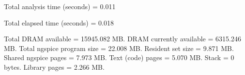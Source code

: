 Total analysis time (seconds) = 0.011

Total elapsed time (seconds) = 0.018 

Total DRAM available = 15945.082 MB.
DRAM currently available = 6315.246 MB.
Total ngspice program size =   22.008 MB.
Resident set size =    9.871 MB.
Shared ngspice pages =    7.973 MB.
Text (code) pages =    5.070 MB.
Stack = 0 bytes.
Library pages =    2.266 MB.

